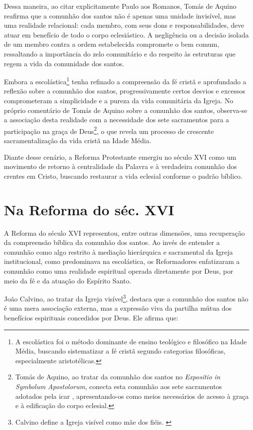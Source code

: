 Dessa maneira, ao citar explicitamente Paulo aos Romanos, Tomás de Aquino reafirma que a comunhão dos santos não é apenas uma unidade invisível, mas uma realidade relacional: cada membro, com seus dons e responsabilidades, deve atuar em benefício de todo o corpo eclesiástico. A negligência ou a decisão isolada de um membro contra a ordem estabelecida compromete o bem comum, ressaltando a importância do zelo comunitário e do respeito às estruturas que regem a vida da comunidade dos santos.

Embora a escolástica\footnote{A escolástica foi o método dominante de ensino teológico e filosófico na Idade Média, buscando sistematizar a fé cristã segundo categorias filosóficas, especialmente aristotélicas.} tenha refinado a compreensão da fé cristã e aprofundado a reflexão sobre a comunhão dos santos, progressivamente certos desvios e excessos comprometeram a simplicidade e a pureza da vida comunitária da Igreja. No próprio comentário de Tomás de Aquino sobre a comunhão dos santos, observa-se a associação desta realidade com a necessidade dos sete sacramentos para a participação na graça de Deus\footnote{Tomás de Aquino, ao tratar da comunhão dos santos no \textit{\foreignlanguage{latin}{Expositio in Symbolum Apostolorum}}, conecta esta comunhão aos sete sacramentos adotados pela \gls{icar} \cite{aquinoCredo2004}, apresentando-os como meios necessários de acesso à graça e à edificação do corpo eclesial.}, o que revela um processo de crescente sacramentalização da vida cristã na Idade Média.

Diante desse cenário, a Reforma Protestante emergiu no século XVI como um movimento de retorno à centralidade da Palavra e à verdadeira comunhão dos crentes em Cristo, buscando restaurar a vida eclesial conforme o padrão bíblico.

\section{Na Reforma do séc. XVI}

A Reforma do século XVI representou, entre outras dimensões, uma recuperação da compreensão bíblica da comunhão dos santos. Ao invés de entender a comunhão como algo restrito à mediação hierárquica e sacramental da Igreja institucional, como predominava na escolástica, os Reformadores enfatizaram a comunhão como uma realidade espiritual operada diretamente por Deus, por meio da fé e da atuação do Espírito Santo.

João Calvino, ao tratar da Igreja visível\footnote{Calvino define a Igreja visível como mãe dos fiéis. \cite[v.~4, p.~1865]{calvino2022}}, destaca que a comunhão dos santos não é uma mera associação externa, mas a expressão viva da partilha mútua dos benefícios espirituais concedidos por Deus. Ele afirma que:

